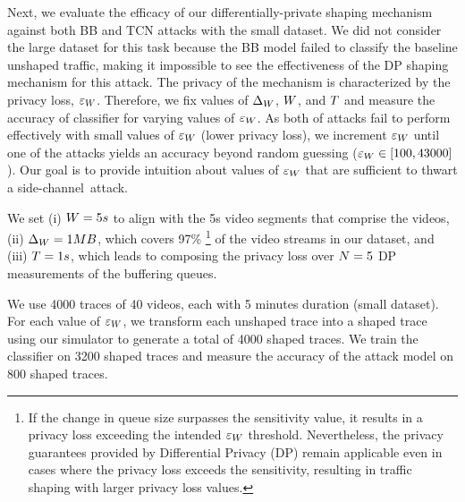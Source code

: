 Next, we evaluate the efficacy of our differentially-private shaping mechanism against both BB and TCN attacks with the small dataset.
We did not consider the large dataset for this task because the BB model failed to classify the baseline unshaped traffic, making it impossible to see the effectiveness of the DP shaping mechanism for this attack.
The privacy of the mechanism is characterized by the privacy loss, $\varepsilon_{W}$.
Therefore, we fix values of $\Delta_{W}$, $W$, and $T$ and measure the accuracy of classifier for varying values of $\varepsilon_{W}$.
As both of attacks fail to perform effectively with small values of $\varepsilon_{W}$ (\ie lower privacy loss), we increment $\varepsilon_{W}$ until one of the attacks yields an accuracy beyond random guessing (\ie $\varepsilon_{W} \in [100, 43000]$).
Our goal is to provide intuition about values of $\varepsilon_{W}$ that are sufficient to thwart a side-channel~attack.

We set (i) $W = 5s$ to align with the 5s video segments that comprise the videos, (ii) $\Delta_{W} = 1 MB$, which covers 97\%
\footnote{
If the change in queue size surpasses the sensitivity value, it results in a privacy loss exceeding the intended $\varepsilon_{W}$ threshold.
Nevertheless, the privacy guarantees provided by Differential Privacy (DP) remain applicable even in cases where the privacy loss exceeds the sensitivity, resulting in traffic shaping with larger privacy loss values.
}
of the video streams in our dataset, and (iii) $T = 1s$, which leads to composing the privacy loss over $N = 5$ DP measurements of the buffering queues.

We use 4000 traces of 40 videos, each with 5 minutes duration (\ie small dataset).
For each value of $\varepsilon_{W}$, we transform each unshaped trace into a shaped trace using our simulator to generate a total of 4000 shaped traces.
We train the classifier on 3200 shaped traces and measure the accuracy of the attack model on 800 shaped traces.

